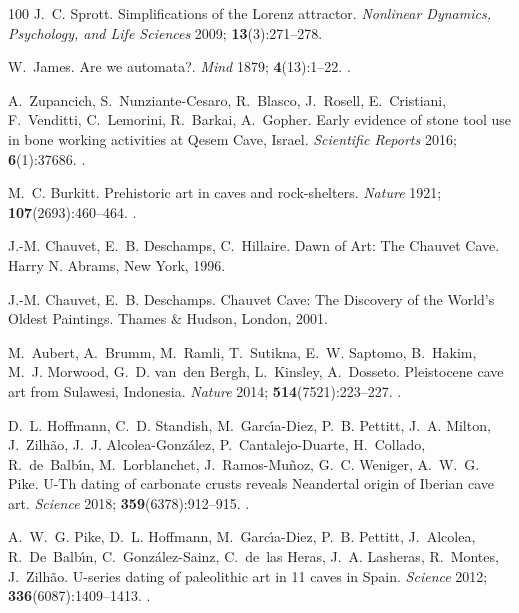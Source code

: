 \documentclass{ws-ijmpb}
\begin{document}
\begin{thebibliography}{100}
J.~C. Sprott. Simplifications of the {L}orenz attractor. \emph{Nonlinear
  Dynamics, Psychology, and Life Sciences} 2009; \textbf{13}(3):271--278.

W.~James. Are we automata?. \emph{Mind} 1879; \textbf{4}(13):1--22.
\newblock \href {http://doi.org/10.1093/mind/os-4.13.1}
  {}.

A.~Zupancich, S.~Nunziante-Cesaro, R.~Blasco, J.~Rosell, E.~Cristiani,
  F.~Venditti, C.~Lemorini, R.~Barkai, A.~Gopher. Early evidence of stone tool
  use in bone working activities at {Q}esem {C}ave, {I}srael. \emph{Scientific
  Reports} 2016; \textbf{6}(1):37686.
\newblock \href {http://doi.org/10.1038/srep37686}
  {}.

M.~C. Burkitt. Prehistoric art in caves and rock-shelters. \emph{Nature} 1921;
  \textbf{107}(2693):460--464.
\newblock \href {http://doi.org/10.1038/107460a0}
  {}.

J.-M. Chauvet, E.~B. Deschamps, C.~Hillaire. Dawn of Art: The Chauvet Cave.
  Harry N. Abrams, New York, 1996.

J.-M. Chauvet, E.~B. Deschamps. Chauvet Cave: The Discovery of the World's
  Oldest Paintings. Thames \& Hudson, London, 2001.

M.~Aubert, A.~Brumm, M.~Ramli, T.~Sutikna, E.~W. Saptomo, B.~Hakim, M.~J.
  Morwood, G.~D. van~den Bergh, L.~Kinsley, A.~Dosseto. Pleistocene cave art
  from {S}ulawesi, {I}ndonesia. \emph{Nature} 2014;
  \textbf{514}(7521):223--227.
\newblock \href {http://doi.org/10.1038/nature13422}
  {}.

D.~L. Hoffmann, C.~D. Standish, M.~Garc\'{\i}a-Diez, P.~B. Pettitt, J.~A.
  Milton, J.~Zilh\~{a}o, J.~J. Alcolea-Gonz\'{a}lez, P.~Cantalejo-Duarte,
  H.~Collado, R.~de~Balb\'{\i}n, M.~Lorblanchet, J.~Ramos-Mu\~{n}oz, G.~C.
  Weniger, A.~W.~G. Pike. U-{T}h dating of carbonate crusts reveals
  {N}eandertal origin of {I}berian cave art. \emph{Science} 2018;
  \textbf{359}(6378):912--915.
\newblock \href {http://doi.org/10.1126/science.aap7778}
  {}.

A.~W.~G. Pike, D.~L. Hoffmann, M.~Garc\'{\i}a-Diez, P.~B. Pettitt, J.~Alcolea,
  R.~De~Balb\'{\i}n, C.~Gonz\'{a}lez-Sainz, C.~de~las Heras, J.~A. Lasheras,
  R.~Montes, J.~Zilh\~{a}o. U-series dating of paleolithic art in 11 caves in
  {S}pain. \emph{Science} 2012; \textbf{336}(6087):1409--1413.
\newblock \href {http://doi.org/10.1126/science.1219957}
  {}.


\end{thebibliography}
\end{document}

